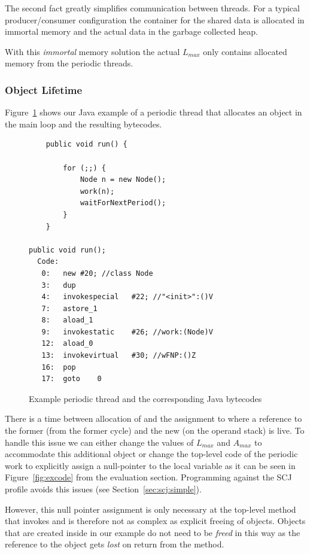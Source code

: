 The second fact greatly simplifies communication between threads.
For a typical producer/consumer configuration the container for the
shared data is allocated in immortal memory and the actual data in
the garbage collected heap.

With this \emph{immortal} memory solution the actual $L_{max}$ only
contains allocated memory from the periodic threads.

\subsubsection{Object Lifetime} \label{sec:wc:live}

Figure~\ref{fig:bcnode} shows our Java example of a periodic thread
that allocates an object in the main loop and the resulting
bytecodes.

\begin{figure}
\begin{center}
{\footnotesize
\begin{verbatim}
    public void run() {

        for (;;) {
            Node n = new Node();
            work(n);
            waitForNextPeriod();
        }
    }

public void run();
  Code:
   0:   new #20; //class Node
   3:   dup
   4:   invokespecial   #22; //"<init>":()V
   7:   astore_1
   8:   aload_1
   9:   invokestatic    #26; //work:(Node)V
   12:  aload_0
   13:  invokevirtual   #30; //wFNP:()Z
   16:  pop
   17:  goto    0
\end{verbatim}
    \caption{Example periodic thread and the corresponding Java bytecodes}
\label{fig:bcnode} }
\end{center}
\end{figure}

There is a time between allocation of  and the assignment
to  where a reference to the former  (from the
former cycle) and the new  (on the operand stack) is
live. To handle this issue we can either change the values of
$L_{max}$ and $A_{max}$ to accommodate this additional object or
change the top-level code of the periodic work to explicitly assign
a null-pointer to the local variable  as it can be seen in
Figure~\ref{fig:excode} from the evaluation section. Programming
against the SCJ profile avoids this issues (see
Section~\ref{sec:scj:simple}).

However, this null pointer assignment is only necessary at the
top-level method that invokes  and is
therefore not as complex as explicit freeing of objects. Objects
that are created inside  in our example do not need to be
\emph{freed} in this way as the reference to the object gets
\emph{lost} on return from the method.








